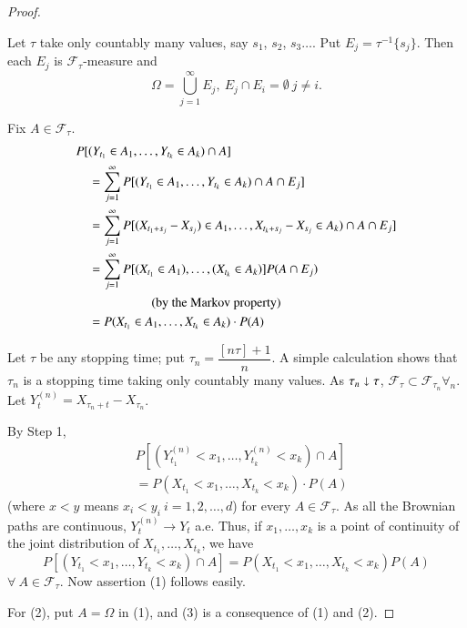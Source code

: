 \begin{proof}
\setcounter{step}{0}
\begin{step}
Let $\tau$ take only countably many values, say $s_{1}$, $s_{2}$,
$s_{3}\ldots$. Put $E_{j}=\tau^{-1}\{s_{j}\}$. Then each $E_{j}$ is
$\mathscr{F}_{\tau}$-measure and 
$$
\Omega=\bigcup\limits^{\infty}_{j=1}E_{j},\ E_{j}\cap
E_{i}=\emptyset\ j\neq i.
$$\pageoriginale

Fix $A\in \mathscr{F}_{\tau}$.
\begin{align*}
&P[(Y_{t_{1}}\in A_{1},\ldots,Y_{t_{k}}\in A_{k})\cap A]\\
&\quad =\sum\limits^{\infty}_{j=1}P[(Y_{t_{1}}\in
    A_{1},\ldots,Y_{t_{k}}\in A_{k})\cap A\cap E_{j}]\\
&\quad =\sum\limits^{\infty}_{j=1}P[(X_{t_{1}+s_{j}}-X_{s_{j}})\in
    A_{1},\ldots,X_{t_{k}+s_{j}}-X_{s_{j}}\in A_{k})\cap A\cap
    E_{j}]\\
&\quad =\sum\limits^{\infty}_{j=1}P[(X_{t_{1}}\in
    A_{1}),\ldots,(X_{t_{k}}\in A_{k})]P(A\cap E_{j})\\
&\hspace{2cm}\text{~ (by the
    Markov property)}\\
&\quad =P(X_{t_{1}}\in A_{1},\ldots,X_{t_{k}}\in A_{k})\cdot P(A)
\end{align*}
\end{step}

\begin{step}%
Let $\tau$ be any stopping time; put
$\tau_{n}=\dfrac{[n\tau]+1}{n}$. A simple calculation shows that
$\tau_{n}$ is a stopping time taking only countably many values. As
$\tau_{n}\shortdownarrow \tau$, $\mathscr{F}_{\tau}\subset
\mathscr{F}_{\tau_{n}}\forall_{n}$. Let
$Y^{(n)}_{t}=X_{\tau_{n}+t}-X_{\tau_{n}}$. 
\end{step}

By Step 1,
\begin{align*}
& P[(Y^{(n)}_{t_{1}}<x_{1},\ldots,Y^{(n)}_{t_{k}}<x_{k})\cap A]\\
& =P(X_{t_{1}}<x_{1},\ldots,X_{t_{k}}<x_{k})\cdot P(A)
\end{align*}
(where $x<y$ means $x_{i}<y_{i} \ i=1,2,\ldots,d$) for every $A\in
\mathscr{F}_{\tau}$. As all the Brownian paths are continuous,
$Y^{(n)}_{t}\to Y_{t}$ a.e. Thus, if $x_{1},\ldots,x_{k}$ is a point
of continuity of the joint distribution of
$X_{t_{1}},\ldots,X_{t_{k}}$, we have
$$
P[(Y_{t_{1}}<x_{1},\ldots,Y_{t_{k}}<x_{k})\cap A]=P(X_{t_{1}}<x_{1},\ldots,X_{t_{k}}<x_{k})P(A)
$$\pageoriginale
$\forall\ A\in \mathscr{F}_{\tau}$. Now assertion (1) follows easily.

For (2), put $A=\Omega$ in (1), and (3) is a consequence of (1) and (2).
\end{proof}
